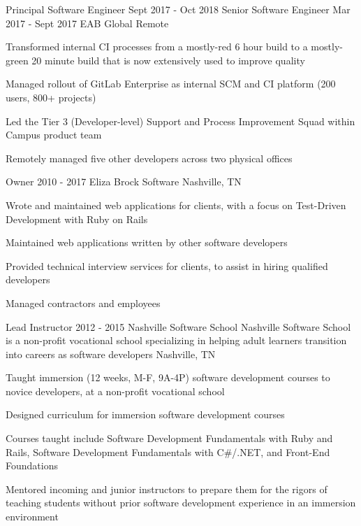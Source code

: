 \begin{cventries}
  \doublecventry
  {Principal Software Engineer}
  {Sept 2017 - Oct 2018}
  {Senior Software Engineer}
  {Mar 2017 - Sept 2017}
  {EAB Global}
  {Remote}
  {
    \begin{cvitems}
      \item Transformed internal CI processes from a mostly-red 6 hour build to a mostly-green 20 minute build that is now extensively used to improve quality
      \item Managed rollout of GitLab Enterprise as internal SCM and CI platform (200 users, 800+ projects)
      \item Led the Tier 3 (Developer-level) Support and Process Improvement Squad within Campus product team
      \item Remotely managed five other developers across two physical offices
    \end{cvitems}
  }

  \cventry
  {Owner}
  {2010 - 2017}
  {Eliza Brock Software}
  {Nashville, TN}
  {
    \begin{cvitems}
      \item Wrote and maintained web applications for clients, with a focus on Test-Driven \mbox{Development} with Ruby on Rails
      \item Maintained web applications written by other software developers
      \item Provided technical interview services for clients, to assist in hiring qualified developers
      \item Managed contractors and employees
    \end{cvitems}
  }

  \cventrywithcompanynote
  {Lead Instructor}
  {2012 - 2015}
  {Nashville Software School}
  {Nashville Software School is a non-profit vocational school specializing in helping adult learners transition into careers as software developers}
  {Nashville, TN}
  {
    \begin{cvitems}
      \item Taught immersion (12 weeks, M-F, 9A-4P) software development courses to novice developers, at a non-profit vocational school
      \item Designed curriculum for immersion software development courses
      \item Courses taught include Software Development Fundamentals with Ruby and Rails, Software Development Fundamentals with C\#/.NET, and Front-End Foundations
      \item Mentored incoming and junior instructors to prepare them for the rigors of teaching students without prior software development experience in an immersion environment
    \end{cvitems}
  }

\end{cventries}

